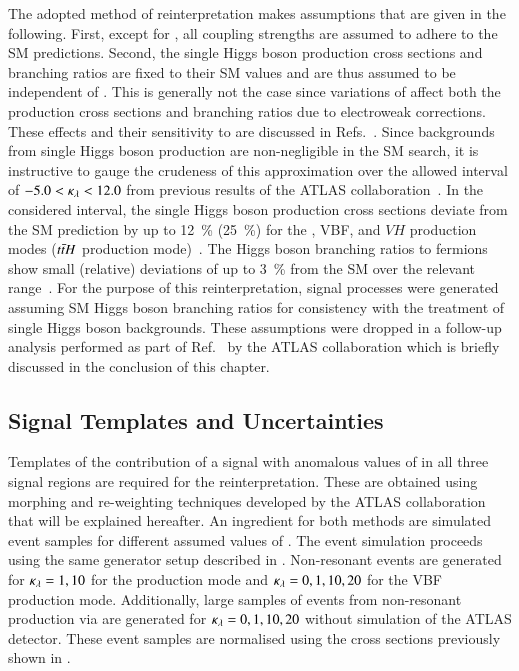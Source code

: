 The adopted method of reinterpretation makes assumptions that are
given in the following. First, except for \klambda, all coupling
strengths are assumed to adhere to the SM predictions. Second, the
single Higgs boson production cross sections and branching ratios are
fixed to their SM values and are thus assumed to be independent of
\klambda. This is generally not the case since variations of \klambda
affect both the production cross sections and branching ratios due to
electroweak corrections. These effects and their sensitivity to
\klambda are discussed in
Refs.~\cite{ATL-PHYS-PUB-2019-009,Degrassi:2016wml,Maltoni:2017ims}.
Since backgrounds from single Higgs boson production are
non-negligible in the SM \HH search, it is instructive to gauge the
crudeness of this approximation over the allowed interval of
$-5.0 < \kappa_{\lambda} < 12.0$ from previous results of the ATLAS
collaboration~\cite{HDBS-2018-58}. In the considered \klambda
interval, the single Higgs boson production cross sections deviate
from the SM prediction by up to \SI{12}{\percent} (\SI{25}{\percent})
for the \ggF, VBF, and $VH$ production modes ($t\bar{t} H$ production
mode)~\cite{ATL-PHYS-PUB-2019-009}. The Higgs boson branching ratios
to fermions show small (relative) deviations of up to \SI{3}{\percent}
from the SM over the relevant \klambda
range~\cite{ATL-PHYS-PUB-2019-009}. For the purpose of this
reinterpretation, signal processes were generated assuming SM Higgs
boson branching ratios for consistency with the treatment of single
Higgs boson backgrounds. These assumptions were dropped in a follow-up
analysis performed as part of Ref.~\cite{ATL-HDBS-2022-03-002} by the
ATLAS collaboration which is briefly discussed in the conclusion of
this chapter.


\subsection{Signal Templates and Uncertainties}%
\label{sec:self_coupling_signals}

Templates of the contribution of a signal with anomalous values of
\klambda in all three signal regions are required for the
reinterpretation. These are obtained using morphing and re-weighting
techniques developed by the ATLAS collaboration that will be explained
hereafter. An ingredient for both methods are simulated event samples
for different assumed values of \klambda. The event simulation
proceeds using the same generator setup described in
. Non-resonant \HH events are generated
for $\kappa_{\lambda} = 1, 10$ for the \ggF production mode and
$\kappa_{\lambda} = 0, 1, 10, 20$ for the VBF production mode. Additionally,
large samples of events from non-resonant \HH production via \ggF are
generated for $\kappa_{\lambda} = 0, 1, 10, 20$ without simulation of the
ATLAS detector. These event samples are normalised using the cross
sections previously shown in .


